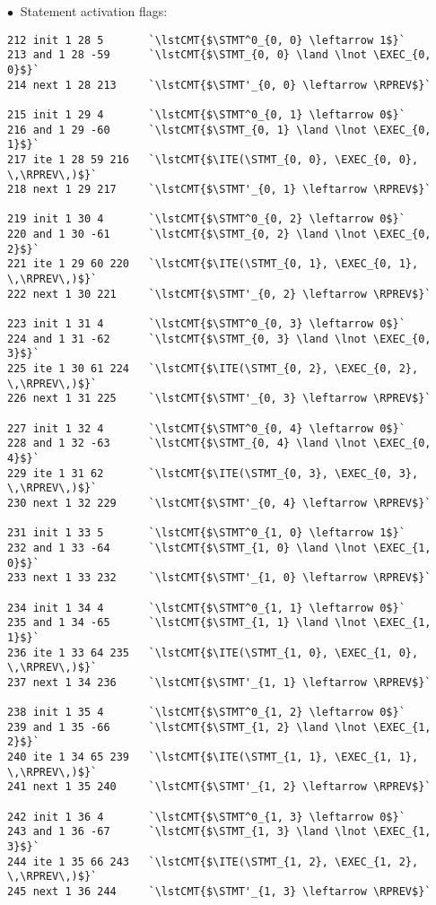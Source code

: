 \noindent
$\bullet\ $ Statement activation flags:
\begin{lstlisting}[style=btor2]
212 init 1 28 5       `\lstCMT{$\STMT^0_{0, 0} \leftarrow 1$}`
213 and 1 28 -59      `\lstCMT{$\STMT_{0, 0} \land \lnot \EXEC_{0, 0}$}`
214 next 1 28 213     `\lstCMT{$\STMT'_{0, 0} \leftarrow \RPREV$}`

215 init 1 29 4       `\lstCMT{$\STMT^0_{0, 1} \leftarrow 0$}`
216 and 1 29 -60      `\lstCMT{$\STMT_{0, 1} \land \lnot \EXEC_{0, 1}$}`
217 ite 1 28 59 216   `\lstCMT{$\ITE(\STMT_{0, 0}, \EXEC_{0, 0}, \,\RPREV\,)$}`
218 next 1 29 217     `\lstCMT{$\STMT'_{0, 1} \leftarrow \RPREV$}`

219 init 1 30 4       `\lstCMT{$\STMT^0_{0, 2} \leftarrow 0$}`
220 and 1 30 -61      `\lstCMT{$\STMT_{0, 2} \land \lnot \EXEC_{0, 2}$}`
221 ite 1 29 60 220   `\lstCMT{$\ITE(\STMT_{0, 1}, \EXEC_{0, 1}, \,\RPREV\,)$}`
222 next 1 30 221     `\lstCMT{$\STMT'_{0, 2} \leftarrow \RPREV$}`

223 init 1 31 4       `\lstCMT{$\STMT^0_{0, 3} \leftarrow 0$}`
224 and 1 31 -62      `\lstCMT{$\STMT_{0, 3} \land \lnot \EXEC_{0, 3}$}`
225 ite 1 30 61 224   `\lstCMT{$\ITE(\STMT_{0, 2}, \EXEC_{0, 2}, \,\RPREV\,)$}`
226 next 1 31 225     `\lstCMT{$\STMT'_{0, 3} \leftarrow \RPREV$}`

227 init 1 32 4       `\lstCMT{$\STMT^0_{0, 4} \leftarrow 0$}`
228 and 1 32 -63      `\lstCMT{$\STMT_{0, 4} \land \lnot \EXEC_{0, 4}$}`
229 ite 1 31 62       `\lstCMT{$\ITE(\STMT_{0, 3}, \EXEC_{0, 3}, \,\RPREV\,)$}`
230 next 1 32 229     `\lstCMT{$\STMT'_{0, 4} \leftarrow \RPREV$}`

231 init 1 33 5       `\lstCMT{$\STMT^0_{1, 0} \leftarrow 1$}`
232 and 1 33 -64      `\lstCMT{$\STMT_{1, 0} \land \lnot \EXEC_{1, 0}$}`
233 next 1 33 232     `\lstCMT{$\STMT'_{1, 0} \leftarrow \RPREV$}`

234 init 1 34 4       `\lstCMT{$\STMT^0_{1, 1} \leftarrow 0$}`
235 and 1 34 -65      `\lstCMT{$\STMT_{1, 1} \land \lnot \EXEC_{1, 1}$}`
236 ite 1 33 64 235   `\lstCMT{$\ITE(\STMT_{1, 0}, \EXEC_{1, 0}, \,\RPREV\,)$}`
237 next 1 34 236     `\lstCMT{$\STMT'_{1, 1} \leftarrow \RPREV$}`

238 init 1 35 4       `\lstCMT{$\STMT^0_{1, 2} \leftarrow 0$}`
239 and 1 35 -66      `\lstCMT{$\STMT_{1, 2} \land \lnot \EXEC_{1, 2}$}`
240 ite 1 34 65 239   `\lstCMT{$\ITE(\STMT_{1, 1}, \EXEC_{1, 1}, \,\RPREV\,)$}`
241 next 1 35 240     `\lstCMT{$\STMT'_{1, 2} \leftarrow \RPREV$}`

242 init 1 36 4       `\lstCMT{$\STMT^0_{1, 3} \leftarrow 0$}`
243 and 1 36 -67      `\lstCMT{$\STMT_{1, 3} \land \lnot \EXEC_{1, 3}$}`
244 ite 1 35 66 243   `\lstCMT{$\ITE(\STMT_{1, 2}, \EXEC_{1, 2}, \,\RPREV\,)$}`
245 next 1 36 244     `\lstCMT{$\STMT'_{1, 3} \leftarrow \RPREV$}`


\end{lstlisting}
